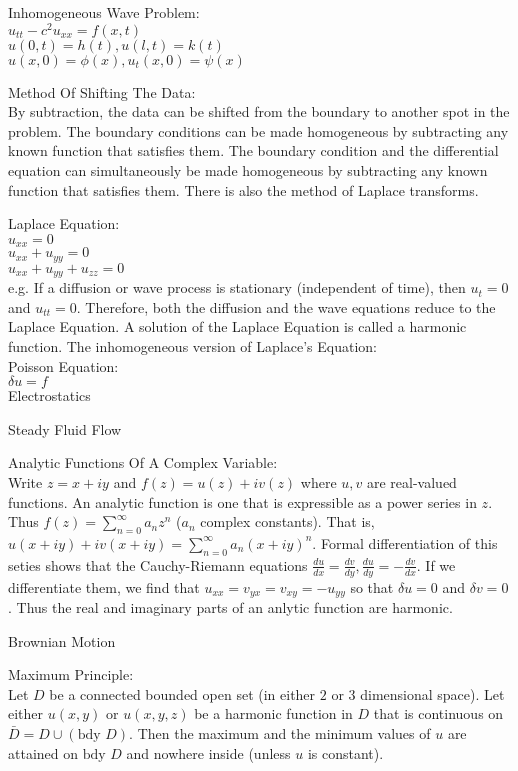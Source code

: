 Inhomogeneous Wave Problem: \\
$u_{tt}-c^2 u_{xx}=f(x,t)$ \\
$u(0,t)=h(t), u(l,t)=k(t)$ \\
$u(x,0)=\phi (x), u_t (x,0)=\psi (x)$

Method Of Shifting The Data: \\
By subtraction, the data can be shifted from the boundary to another spot in the problem. The boundary conditions can be made homogeneous by subtracting any known function that satisfies them. The boundary condition and the differential equation can simultaneously be made homogeneous by subtracting any known function that satisfies them. There is also the method of Laplace transforms.

Laplace Equation: \\
$u_{xx}=0$ \\
$u_{xx}+u_{yy}=0$ \\
$u_{xx}+u_{yy}+u_{zz}=0$ \\
e.g. If a diffusion or wave process is stationary (independent of time), then $u_t=0$ and $u_{tt}=0$. Therefore, both the diffusion and the wave equations reduce to the Laplace Equation. A solution of the Laplace Equation is called a harmonic function. The inhomogeneous version of Laplace's Equation: \\
Poisson Equation: \\
$\delta u=f$ \\

Electrostatics

Steady Fluid Flow

Analytic Functions Of A Complex Variable: \\
Write $z=x+iy$ and $f(z)=u(z)+iv(z)$ where $u,v$ are real-valued functions. An analytic function is one that is expressible as a power series in $z$. Thus $f(z)=\sum_{n=0}^{\infty} a_n z^n$ ($a_n$ complex constants). That is, $u(x+iy)+iv(x+iy)=\sum_{n=0}^{\infty} a_n (x+iy)^n$. Formal differentiation of this seties shows that the Cauchy-Riemann equations $\frac{du}{dx}=\frac{dv}{dy}, \frac{du}{dy}=-\frac{dv}{dx}$. If we differentiate them, we find that $u_{xx}=v_{yx}=v_{xy}=-u_{yy}$ so that $\delta u=0$ and $\delta v=0$. Thus the real and imaginary parts of an anlytic function are harmonic.

Brownian Motion

Maximum Principle: \\
Let $D$ be a connected bounded open set (in either $2$ or $3$ dimensional space). Let either $u(x,y)$ or $u(x,y,z)$ be a harmonic function in $D$ that is continuous on $\bar{D}=D \cup (\text{bdy }D)$. Then the maximum and the minimum values of $u$ are attained on $\text{bdy }D$ and nowhere inside (unless $u$ is constant).

